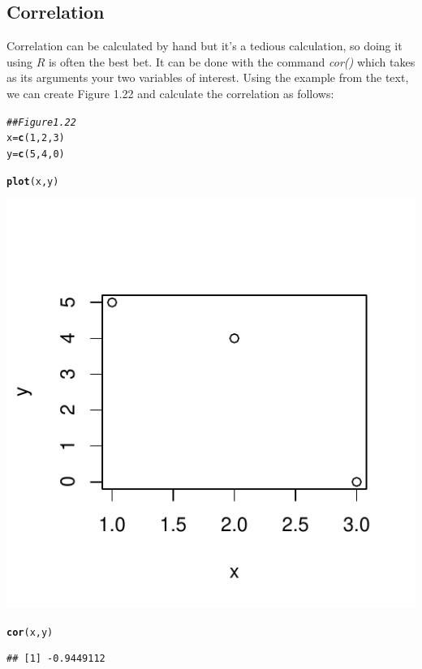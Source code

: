 \documentclass[11pt]{article}\usepackage[]{graphicx}\usepackage[]{color}
\makeatletter
\def\maxwidth{ %
  \ifdim\Gin@nat@width>\linewidth
    \linewidth
  \else
    \Gin@nat@width
  \fi
}
\newcommand{\hlnum}[1]{\textcolor[rgb]{0.686,0.059,0.569}{#1}}%
\newcommand{\hlcom}[1]{\textcolor[rgb]{0.678,0.584,0.686}{\textit{#1}}}%
\newcommand{\hlstd}[1]{\textcolor[rgb]{0.345,0.345,0.345}{#1}}%
\newcommand{\hlkwb}[1]{\textcolor[rgb]{0.69,0.353,0.396}{#1}}%
\newcommand{\hlkwd}[1]{\textcolor[rgb]{0.737,0.353,0.396}{\textbf{#1}}}%
\newenvironment{kframe}{%
 \def\at@end@of@kframe{}%
 \ifinner\ifhmode%
  \def\at@end@of@kframe{\end{minipage}}%
  \begin{minipage}{\columnwidth}%
 \fi\fi%
 \def\FrameCommand##1{\hskip\@totalleftmargin \hskip-\fboxsep
 \colorbox{shadecolor}{##1}\hskip-\fboxsep
     \hskip-\linewidth \hskip-\@totalleftmargin \hskip\columnwidth}%
 \MakeFramed {\advance\hsize-\width
   \@totalleftmargin\z@ \linewidth\hsize
   \@setminipage}}%
 {\par\unskip\endMakeFramed%
 \at@end@of@kframe}
\newenvironment{knitrout}{}{} %
\makeatother
\begin{document}
\subsection{Correlation}
Correlation can be calculated by hand but it's a tedious calculation, so doing it using $R$ is often the best bet.  It can be done with the command \textit{cor()} which takes as its arguments your two variables of interest.  Using the example from the text, we can create Figure 1.22 and calculate the correlation as follows:
\begin{knitrout}
\color{fgcolor}\begin{kframe}
\begin{alltt}
\hlcom{## Figure 1.22}
\hlstd{x} \hlkwb{=} \hlkwd{c}\hlstd{(}\hlnum{1}\hlstd{,} \hlnum{2}\hlstd{,} \hlnum{3}\hlstd{)}
\hlstd{y} \hlkwb{=} \hlkwd{c}\hlstd{(}\hlnum{5}\hlstd{,} \hlnum{4}\hlstd{,} \hlnum{0}\hlstd{)}

\hlkwd{plot}\hlstd{(x,y)}
\end{alltt}
\end{kframe}
\includegraphics[width=\maxwidth]{figure/unnamed-chunk-19-1} 
\begin{kframe}\begin{alltt}
\hlkwd{cor}\hlstd{(x,y)}
\end{alltt}
\begin{verbatim}
## [1] -0.9449112
\end{verbatim}
\end{kframe}
\end{knitrout}
\end{document}
